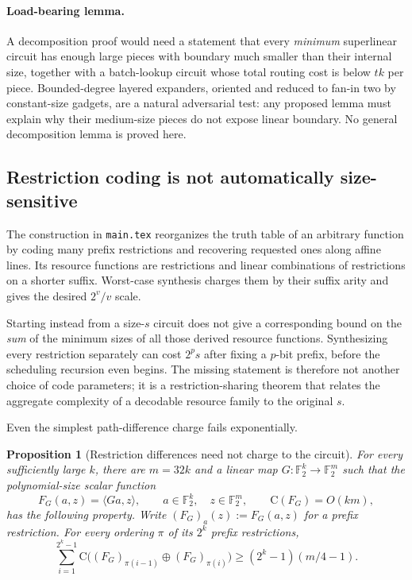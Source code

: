 \documentclass[11pt]{article}
\newtheorem{proposition}[theorem]{Proposition}
\theoremstyle{definition}
\newcommand{\F}{\mathbb F}
\newcommand{\C}{\mathrm{C}}
\begin{document}
\paragraph{Load-bearing lemma.}
A decomposition proof would need a statement that every \emph{minimum}
superlinear circuit has enough large pieces with boundary much smaller than
their internal size, together with a batch-lookup circuit whose total routing
cost is below $tk$ per piece.  Bounded-degree layered expanders, oriented and
reduced to fan-in two by constant-size gadgets, are a natural adversarial test:
any proposed lemma must explain why their medium-size pieces do not expose
linear boundary.  No general decomposition lemma is proved here.

\subsection{Restriction coding is not automatically size-sensitive}

The construction in \texttt{main.tex} reorganizes the truth table of an
arbitrary function by coding many prefix restrictions and recovering requested
ones along affine lines.  Its resource functions are restrictions and linear
combinations of restrictions on a shorter suffix.  Worst-case synthesis
charges them by their suffix arity and gives the desired $2^v/v$ scale.

Starting instead from a size-$s$ circuit does not give a corresponding bound
on the \emph{sum} of the minimum sizes of all those derived resource
functions.  Synthesizing every restriction separately can cost $2^p s$ after
fixing a $p$-bit prefix, before the scheduling recursion even begins.  The
missing statement is therefore not another choice of code parameters; it is
a restriction-sharing theorem that relates the aggregate complexity of a
decodable resource family to the original $s$.

Even the simplest path-difference charge fails exponentially.

\begin{proposition}[Restriction differences need not charge to the circuit]
\label{prop:restriction-obstruction}
For every sufficiently large $k$, there are $m=32k$ and a linear map
$G:\F_2^k\to\F_2^m$ such that the polynomial-size scalar function
\[
  F_G(a,z)=\langle Ga,z\rangle,
  \qquad a\in\F_2^k,\quad z\in\F_2^m,
  \qquad \C(F_G)=O(km),
\]
has the following property.  Write
$(F_G)_a(z):=F_G(a,z)$ for a prefix restriction.  For every ordering $\pi$
of its $2^k$ prefix restrictions,
\[
 \sum_{i=1}^{2^k-1}
 \C\bigl((F_G)_{\pi(i-1)}\oplus(F_G)_{\pi(i)}\bigr)
 \ge(2^k-1)(m/4-1).
\]
\end{proposition}
\end{document}
